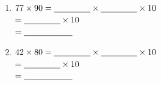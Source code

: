 \documentclass[11pt, a4paper]{article}
\begin{document}
\begin{enumerate}[label=\arabic*.]
    \item $77 \times 90 = \text{\underline{\hspace{1.5cm}}} \times \text{\underline{\hspace{1.5cm}}} \times 10$ \\
    \phantom{$77 \times 90$} $= \text{\underline{\hspace{1.5cm}}} \times 10$ \\
    \phantom{$77 \times 90$} $= \text{\underline{\hspace{2cm}}}$

    \item $42 \times 80 = \text{\underline{\hspace{1.5cm}}} \times \text{\underline{\hspace{1.5cm}}} \times 10$ \\
    \phantom{$42 \times 80$} $= \text{\underline{\hspace{1.5cm}}} \times 10$ \\
    \phantom{$42 \times 80$} $= \text{\underline{\hspace{2cm}}}$
\end{enumerate}

\pagebreak
\end{document}
